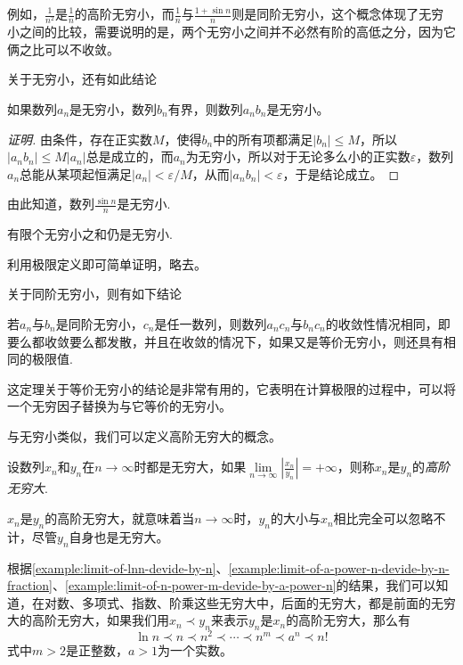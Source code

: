 例如，$\frac{1}{n^2}$是$\frac{1}{n}$的高阶无穷小，而$\frac{1}{n}$与$\frac{1+\sin{n}}{n}$则是同阶无穷小，这个概念体现了无穷小之间的比较，需要说明的是，两个无穷小之间并不必然有阶的高低之分，因为它俩之比可以不收敛。


关于无穷小，还有如此结论
\begin{theorem}
  如果数列$a_n$是无穷小，数列$b_n$有界，则数列$a_nb_n$是无穷小。
\end{theorem}

\begin{proof}[证明]
  由条件，存在正实数$M$，使得$b_n$中的所有项都满足$|b_n|\leqslant M$，所以$|a_nb_n| \leqslant M |a_n|$总是成立的，而$a_n$为无穷小，所以对于无论多么小的正实数$\varepsilon$，数列$a_n$总能从某项起恒满足$|a_n|<\varepsilon/M$，从而$|a_nb_n|<\varepsilon$，于是结论成立。
\end{proof}

由此知道，数列$\frac{\sin{n}}{n}$是无穷小.

\begin{theorem}
  有限个无穷小之和仍是无穷小.
\end{theorem}

利用极限定义即可简单证明，略去。

关于同阶无穷小，则有如下结论
\begin{theorem}
  若$a_n$与$b_n$是同阶无穷小，$c_n$是任一数列，则数列$a_nc_n$与$b_nc_n$的收敛性情况相同，即要么都收敛要么都发散，并且在收敛的情况下，如果又是等价无穷小，则还具有相同的极限值.
\end{theorem}

这定理关于等价无穷小的结论是非常有用的，它表明在计算极限的过程中，可以将一个无穷因子替换为与它等价的无穷小。

与无穷小类似，我们可以定义高阶无穷大的概念。

\begin{definition}
  设数列$x_n$和$y_n$在$n\to\infty$时都是无穷大，如果$\lim\limits_{n \to \infty} \left| \frac{x_n}{y_n} \right| = +\infty$，则称$x_n$是$y_n$的\emph{高阶无穷大}.
\end{definition}

$x_n$是$y_n$的高阶无穷大，就意味着当$n\to\infty$时，$y_n$的大小与$x_n$相比完全可以忽略不计，尽管$y_n$自身也是无穷大。

\begin{example}
  \label{example:infinite-large-compare}
  根据\autoref{example:limit-of-lnn-devide-by-n}、\autoref{example:limit-of-a-power-n-devide-by-n-fraction}、\autoref{example:limit-of-n-power-m-devide-by-a-power-n}的结果，我们可以知道，在对数、多项式、指数、阶乘这些无穷大中，后面的无穷大，都是前面的无穷大的高阶无穷大，如果我们用$x_n \prec y_n$来表示$y_n$是$x_n$的高阶无穷大，那么有
  \[ \ln{n} \prec n \prec n^2 \prec \cdots \prec n^m \prec a^n \prec n! \]
  式中$m>2$是正整数，$a>1$为一个实数。
\end{example}

